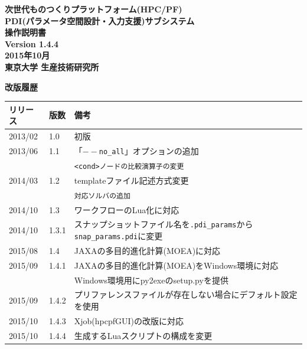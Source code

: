 \documentclass[a4paper,11pt]{jarticle}
\begin{document}
\begin{titlepage}
\vspace*{5cm}
\begin{center}%
{\LARGE \bf 次世代ものつくりプラットフォーム(HPC/PF)\\

PDI(パラメータ空間設計・入力支援)サブシステム\\

操作説明書\\}
\vspace*{2.5cm}
\bf Version 1.4.4\\
\vspace*{1cm}
\bf 2015年10月\\
\vspace*{3.5cm}
{\large\bf 東京大学 生産技術研究所\\}

\end{center}
\end{titlepage}


\newpage

{\Large\bf 改版履歴}

\vspace{12pt}
\begin{tabular}{|l|l|l|} \hline
リリース & 版数 & 備考\hspace*{11cm}\\ \hline
2013/02 & 1.0 & 初版\\ \hline
2013/06 & 1.1 & 「{\tt $--$no\_all}」オプションの追加\\
 & & {\tt <cond>ノードの比較演算子の変更}\\ \hline
2014/03 & 1.2 & templateファイル記述方式変更\\
 & & {\tt 対応ソルバの追加}\\ \hline
2014/10 & 1.3 & ワークフローのLua化に対応\\ \hline
2014/10 & 1.3.1 & スナップショットファイル名を{\tt .pdi\_params}から{\tt snap\_params.pdi}に変更\\ \hline
2015/08 & 1.4 & JAXAの多目的進化計算(MOEA)に対応\\ \hline
2015/09 & 1.4.1 & JAXAの多目的進化計算(MOEA)をWindows環境に対応\\
 & & Windows環境用にpy2exeのsetup.pyを提供\\ \hline
2015/09 & 1.4.2 & プリファレンスファイルが存在しない場合にデフォルト設定を使用\\ \hline
2015/10 & 1.4.3 & Xjob(hpcpfGUI)の改版に対応\\ \hline
2015/10 & 1.4.4 & 生成するLuaスクリプトの構成を変更\\ \hline
\end{tabular}
\end{document}
